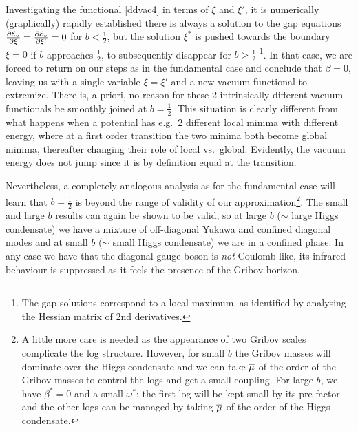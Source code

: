 Investigating the functional \eqref{ddvac4} in terms of $\xi$ and $\xi'$, it is numerically (graphically) rapidly established there is always a solution to the gap equations $\frac{\partial \mathcal{E}_v }{\partial \xi}=\frac{\partial \mathcal{E}_v }{\partial \xi'}=0$ for $b<\frac{1}{2}$, but the solution $\xi^*$ is pushed towards the boundary $\xi=0$ if $b$ approaches $\frac{1}{2}$, to subsequently disappear for $b>\frac{1}{2}$ \footnote{The gap solutions correspond to a local maximum, as identified by analysing the Hessian matrix of 2nd derivatives.}. In that case, we are forced to return on our steps as in the fundamental case and conclude that $\beta=0$, leaving us with a single variable $\xi=\xi'$ and a new vacuum functional to extremize. There is, a priori, no reason for these 2 intrinsically different vacuum functionals be smoothly joined at $b=\frac{1}{2}$. This situation is clearly different from what happens when a potential has e.g.~2 different local minima with different energy, where at a first order transition the two minima both become global minima, thereafter changing their role of local vs.~global. Evidently, the vacuum energy does not jump since it is by definition equal at the transition.

Nevertheless, a completely analogous analysis as for the fundamental case will learn that $b=\frac{1}{2}$ is beyond the range of validity of our approximation\footnote{A little more care is needed as the appearance of two Gribov scales complicate the log structure. However, for small $b$ the Gribov masses will dominate over the Higgs condensate and we can take  $\overline{\mu}$ of the order of the Gribov masses to control the logs and get a small coupling. For large $b$, we have $\beta^*=0$ and a small $\omega^*$: the first log will be kept small by its pre-factor and the other logs can be managed by taking $\overline{\mu}$ of the order of the Higgs condensate.}. The small and large $b$ results can again be shown to be valid, so at large $b$ ($\sim$ large Higgs condensate) we have a mixture of off-diagonal Yukawa and confined diagonal modes and at small $b$ ($\sim$ small Higgs condensate) we are in a confined phase. In any case we have that the diagonal gauge boson is \emph{not} Coulomb-like, its infrared behaviour is suppressed as it feels the presence of the Gribov horizon.






























